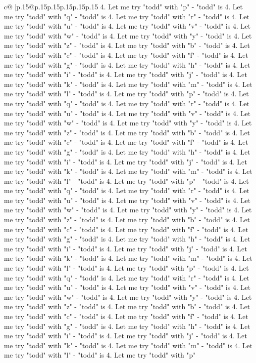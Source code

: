 \documentclass{article}
\begin{document}
{\begin{supertabular}{c@{$\;$}|p{.15\linewidth}@{}p{.15\linewidth}p{.15\linewidth}p{.15\linewidth}p{.15\linewidth}p{.15\linewidth}}
{{{4. Let me try "todd" with "p" {-} "todd" is 4. Let me try "todd" with "q" {-} "todd" is 4. Let me try "todd" with "r" {-} "todd" is 4. Let me try "todd" with "u" {-} "todd" is 4. Let me try "todd" with "v" {-} "todd" is 4. Let me try "todd" with "w" {-} "todd" is 4. Let me try "todd" with "y" {-} "todd" is 4. Let me try "todd" with "z" {-} "todd" is 4. Let me try "todd" with "b" {-} "todd" is 4. Let me try "todd" with "c" {-} "todd" is 4. Let me try "todd" with "f" {-} "todd" is 4. Let me try "todd" with "g" {-} "todd" is 4. Let me try "todd" with "h" {-} "todd" is 4. Let me try "todd" with "i" {-} "todd" is 4. Let me try "todd" with "j" {-} "todd" is 4. Let me try "todd" with "k" {-} "todd" is 4. Let me try "todd" with "m" {-} "todd" is 4. Let me try "todd" with "l" {-} "todd" is 4. Let me try "todd" with "p" {-} "todd" is 4. Let me try "todd" with "q" {-} "todd" is 4. Let me try "todd" with "r" {-} "todd" is 4. Let me try "todd" with "u" {-} "todd" is 4. Let me try "todd" with "v" {-} "todd" is 4. Let me try "todd" with "w" {-} "todd" is 4. Let me try "todd" with "y" {-} "todd" is 4. Let me try "todd" with "z" {-} "todd" is 4. Let me try "todd" with "b" {-} "todd" is 4. Let me try "todd" with "c" {-} "todd" is 4. Let me try "todd" with "f" {-} "todd" is 4. Let me try "todd" with "g" {-} "todd" is 4. Let me try "todd" with "h" {-} "todd" is 4. Let me try "todd" with "i" {-} "todd" is 4. Let me try "todd" with "j" {-} "todd" is 4. Let me try "todd" with "k" {-} "todd" is 4. Let me try "todd" with "m" {-} "todd" is 4. Let me try "todd" with "l" {-} "todd" is 4. Let me try "todd" with "p" {-} "todd" is 4. Let me try "todd" with "q" {-} "todd" is 4. Let me try "todd" with "r" {-} "todd" is 4. Let me try "todd" with "u" {-} "todd" is 4. Let me try "todd" with "v" {-} "todd" is 4. Let me try "todd" with "w" {-} "todd" is 4. Let me try "todd" with "y" {-} "todd" is 4. Let me try "todd" with "z" {-} "todd" is 4. Let me try "todd" with "b" {-} "todd" is 4. Let me try "todd" with "c" {-} "todd" is 4. Let me try "todd" with "f" {-} "todd" is 4. Let me try "todd" with "g" {-} "todd" is 4. Let me try "todd" with "h" {-} "todd" is 4. Let me try "todd" with "i" {-} "todd" is 4. Let me try "todd" with "j" {-} "todd" is 4. Let me try "todd" with "k" {-} "todd" is 4. Let me try "todd" with "m" {-} "todd" is 4. Let me try "todd" with "l" {-} "todd" is 4. Let me try "todd" with "p" {-} "todd" is 4. Let me try "todd" with "q" {-} "todd" is 4. Let me try "todd" with "r" {-} "todd" is 4. Let me try "todd" with "u" {-} "todd" is 4. Let me try "todd" with "v" {-} "todd" is 4. Let me try "todd" with "w" {-} "todd" is 4. Let me try "todd" with "y" {-} "todd" is 4. Let me try "todd" with "z" {-} "todd" is 4. Let me try "todd" with "b" {-} "todd" is 4. Let me try "todd" with "c" {-} "todd" is 4. Let me try "todd" with "f" {-} "todd" is 4. Let me try "todd" with "g" {-} "todd" is 4. Let me try "todd" with "h" {-} "todd" is 4. Let me try "todd" with "i" {-} "todd" is 4. Let me try "todd" with "j" {-} "todd" is 4. Let me try "todd" with "k" {-} "todd" is 4. Let me try "todd" with "m" {-} "todd" is 4. Let me try "todd" with "l" {-} "todd" is 4. Let me try "todd" with "p" }}}
\end{supertabular}}
\end{document}
